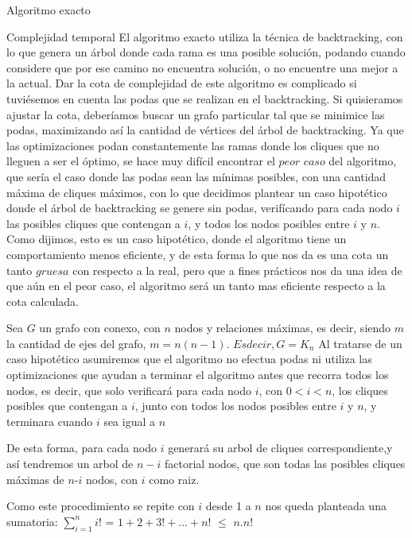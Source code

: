 \begin{section}{Algoritmo exacto}
\begin{subsection}{Complejidad temporal}
		El algoritmo exacto utiliza la técnica de backtracking, con lo que genera un árbol donde cada rama es una posible solución, podando cuando considere que por ese camino no encuentra solución, o no encuentre una mejor a la actual.
		Dar la cota de complejidad de este algoritmo es complicado si tuviésemos en cuenta las podas que se realizan en el backtracking. Si quisieramos ajustar la cota, deberíamos buscar un grafo particular tal que se minimice las podas, maximizando así la cantidad de vértices del árbol de backtracking.
		Ya que las optimizaciones podan constantemente las ramas donde los cliques que no lleguen a ser el óptimo, se hace muy difícil encontrar el $peor$ $caso$ del algoritmo, que sería el caso donde las podas sean las mínimas posibles, con una cantidad máxima de cliques máximos, con lo que decidimos plantear un caso hipotético donde el árbol de backtracking se genere sin podas, verifícando para cada nodo $i$ las posibles cliques que contengan a $i$, y todos los nodos posibles entre $i$ y $n$. Como dijimos, esto es un caso hipotético, donde el algoritmo tiene un comportamiento menos eficiente, y de esta forma lo que nos da es una cota un tanto $gruesa$ con respecto a la real, pero que a fines prácticos nos da una idea de que aún en el peor caso, el algoritmo será un tanto mas eficiente respecto a la cota calculada. 

		Sea $G$ un grafo con conexo, con $n$ nodos y relaciones máximas, es decir, siendo $m$ la cantidad de ejes del grafo, $m = n(n-1)$. $Es decir, G = K_n$
		Al tratarse de un caso hipotético asumiremos que el algoritmo no efectua podas ni utiliza las optimizaciones que ayudan a terminar el algoritmo antes que recorra todos los nodos, es decir, que solo verificará para cada nodo $i$, con $0 < i < n$, los cliques posibles que contengan a $i$, junto con todos los nodos posibles entre $i$ y $n$, y terminara cuando $i$ sea igual a $n$

		De esta forma, para cada nodo $i$ generará su arbol de cliques correspondiente,y así tendremos un arbol de $n-i$ factorial nodos, que son todas las posibles cliques máximas de $n$-$i$ nodos, con $i$ como raiz.

		Como este procedimiento se repite con $i$ desde 1 a $n$ nos queda planteada una sumatoria: $\sum_{i=1}^{n}{i!}$ = $1 + 2 + 3! + ... + n!$ $\leq$  $n.n!$
		
		
		
		\end{subsection}
\end{section}

